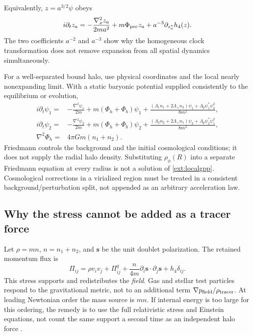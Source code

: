 \documentclass[11pt]{article}
\newcommand{\lap}{\nabla^2}
\begin{document}
Equivalently, $z=a^{3/2}\psi$ obeys
\begin{equation}
 i\partial_t z_a=-\frac{\lap_x z_a}{2ma^2}+m\Phi_{\rm pec}z_a
                              +a^{-3}\partial_{z_a^*}h_4(z).
\end{equation}
The two coefficients $a^{-2}$ and $a^{-3}$ show why the homogeneous clock transformation does not remove expansion from all spatial dynamics simultaneously.

For a well-separated bound halo, use physical coordinates and the local nearly nonexpanding limit. With a static baryonic potential supplied consistently to the equilibrium or evolution,
\begin{align}
 i\partial_t\psi_1={}&-\frac{\lap\psi_1}{2m}+m(\Phi_h+\Phi_b)\psi_1
 +\frac{(\Lambda_1n_1+2\Lambda_\times n_2)\psi_1+
                  \Lambda_p\psi_1^*\psi_2^2}{8m^2},\\
 i\partial_t\psi_2={}&-\frac{\lap\psi_2}{2m}+m(\Phi_h+\Phi_b)\psi_2
 +\frac{(\Lambda_2n_2+2\Lambda_\times n_1)\psi_2+
                  \Lambda_p\psi_2^*\psi_1^2}{8m^2},\\
 \lap\Phi_h={}&4\pi Gm(n_1+n_2).\label{ext:localgpp}
\end{align}
Friedmann controls the background and the initial cosmological conditions; it does not supply the radial halo density. Substituting $\rho_\phi(R)$ into a separate Friedmann equation at every radius is not a solution of \eqref{ext:localgpp}. Cosmological corrections in a virialized region must be treated in a consistent background/perturbation split, not appended as an arbitrary acceleration law.

\subsection{Why the stress cannot be added as a tracer force}
Let $\rho=mn$, $n=n_1+n_2$, and $\mathbf s$ be the unit doublet polarization. The retained momentum flux is
\begin{equation}
 \Pi_{ij}=\rho v_iv_j+\Pi^q_{ij}
       +\frac{n}{4m}\partial_i\mathbf s\cdot\partial_j\mathbf s+h_4\delta_{ij}.
\end{equation}
This stress supports and redistributes the \emph{field}. Gas and stellar test particles respond to the gravitational metric, not to an additional term $\nabla p_{\rm field}/\rho_{\rm tracer}$. At leading Newtonian order the mass source is $mn$. If internal energy is too large for this ordering, the remedy is to use the full relativistic stress and Einstein equations, not count the same support a second time as an independent halo force \cite[Sections 5 and 6.6]{channelmain}.
\end{document}
